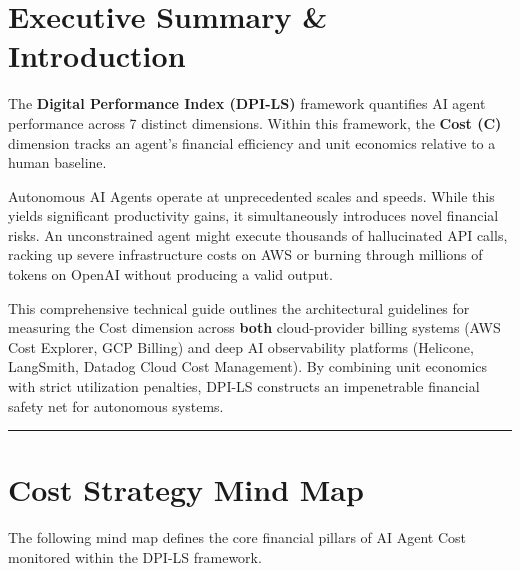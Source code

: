 \documentclass[11pt,a4paper]{article}
\begin{document}
\tableofcontents
\newpage

\section{Executive Summary \& Introduction}

\begin{dpinote}
The \textbf{Digital Performance Index (DPI-LS)} framework quantifies AI agent performance across 7 distinct dimensions. Within this framework, the \textbf{Cost (C)} dimension tracks an agent's financial efficiency and unit economics relative to a human baseline.
\end{dpinote}

Autonomous AI Agents operate at unprecedented scales and speeds. While this yields significant productivity gains, it simultaneously introduces novel financial risks. An unconstrained agent might execute thousands of hallucinated API calls, racking up severe infrastructure costs on AWS or burning through millions of tokens on OpenAI without producing a valid output. 

This comprehensive technical guide outlines the architectural guidelines for measuring the Cost dimension across \textbf{both} cloud-provider billing systems (AWS Cost Explorer, GCP Billing) and deep AI observability platforms (Helicone, LangSmith, Datadog Cloud Cost Management). By combining unit economics with strict utilization penalties, DPI-LS constructs an impenetrable financial safety net for autonomous systems.

\vspace{0.5cm}
\hrule
\vspace{0.5cm}

\section{Cost Strategy Mind Map}

The following mind map defines the core financial pillars of AI Agent Cost monitored within the DPI-LS framework.
\end{document}
